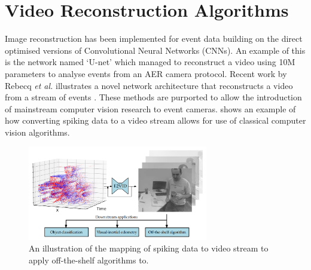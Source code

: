 
\section{Video Reconstruction Algorithms} \label{ssec:video_reconstruction}

Image reconstruction has been implemented for event data building on the direct optimised versions of Convolutional Neural Networks (CNNs). An example of this is the network named `U-net'\cite{UNET} which managed to reconstruct a video using 10M parameters to analyse events from an AER camera protocol. Recent work by Rebecq \textit{et al.} illustrates a novel network architecture that reconstructs a video from a stream of events \cite{spikingToVideo}. These methods are purported to allow the introduction of mainstream computer vision research to event cameras.  shows an example of how converting spiking data to a video stream allows for use of classical computer vision algorithms.

\begin{figure}[htb]
      \centering
      \includegraphics[width=0.7\textwidth]{background/images/spikes_to_video.png}
      \caption{An illustration of the mapping of spiking data to video stream to apply off-the-shelf algorithms to\cite{spikingToVideo}.}
      \label{fig:spikes_to_video}
\end{figure}

